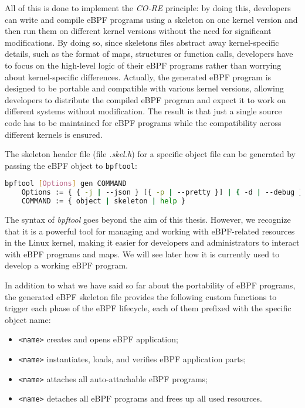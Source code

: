 All of this is done to implement the \textit{CO-RE} principle: by doing this, developers can write and compile eBPF programs using a skeleton on one kernel version and then run them on different kernel versions without the need for significant modifications.
By doing so, since skeletons files abstract away kernel-specific details, such as the format of maps, structures or function calls, developers have to focus on the high-level logic of their eBPF programs rather than worrying about kernel-specific differences.
Actually, the generated eBPF program is designed to be portable and compatible with various kernel versions, allowing developers to distribute the compiled eBPF program and expect it to work on different systems without modification.
The result is that just a single source code has to be maintained for eBPF programs while the compatibility across different kernels is ensured.

The skeleton header file (file \textit{.skel.h}) for a specific object file can be generated by passing the eBPF object to \verb|bpftool|:

\begin{lstlisting}[language=bash, caption={bpftool command syntax}]
	bpftool [Options] gen COMMAND
	Options := { { -j | --json } [{ -p | --pretty }] | { -d | --debug } | { -L | --use-loader } }
	COMMAND := { object | skeleton | help }
\end{lstlisting}

The syntax of \textit{bpftool} goes beyond the aim of this thesis.
However, we recognize that it is a powerful tool for managing and working with eBPF-related resources in the Linux kernel, making it easier for developers and administrators to interact with eBPF programs and maps.
We will see later how it is currently used to develop a working eBPF program.

In addition to what we have said so far about the portability of eBPF programs, the generated eBPF skeleton file provides the following custom functions to trigger each phase of the eBPF lifecycle, each of them prefixed with the specific object name:

\begin{itemize}
	\item \texttt{<name>} creates and opens eBPF application;
	\item \texttt{<name>} instantiates, loads, and verifies 
		eBPF application parts;
	\item \texttt{<name>} attaches all auto-attachable eBPF 
		programs;
	\item \texttt{<name>} detaches all eBPF programs and 
		frees up all used resources.
\end{itemize}

